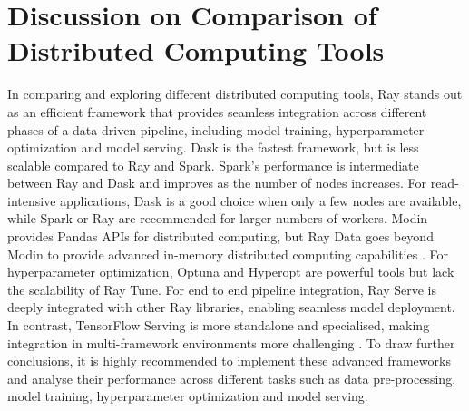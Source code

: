 \clearpage


\section{Discussion on Comparison of Distributed Computing Tools}

In comparing and exploring different distributed computing tools, Ray stands out as an efficient framework that provides seamless integration across different phases of a data-driven pipeline, including model training, hyperparameter optimization and model serving. Dask is the fastest framework, but is less scalable compared to Ray and Spark. Spark's performance is intermediate between Ray and Dask and improves as the number of nodes increases. For read-intensive applications, Dask is a good choice when only a few nodes are available, while Spark or Ray are recommended for larger numbers of workers. Modin provides Pandas APIs for distributed computing, but Ray Data goes beyond Modin to provide advanced in-memory distributed computing capabilities \cite{modin_docs}. For hyperparameter optimization, Optuna and Hyperopt are powerful tools but lack the scalability of Ray Tune. For end to end pipeline integration, Ray Serve is deeply integrated with other Ray libraries, enabling seamless model deployment. In contrast, TensorFlow Serving is more standalone and specialised, making integration in multi-framework environments more challenging \cite{tensorflow}. To draw further conclusions, it is highly recommended to implement these advanced frameworks and analyse their performance across different tasks such as data pre-processing, model training, hyperparameter optimization and model serving. \cite{baglioni2023large}



